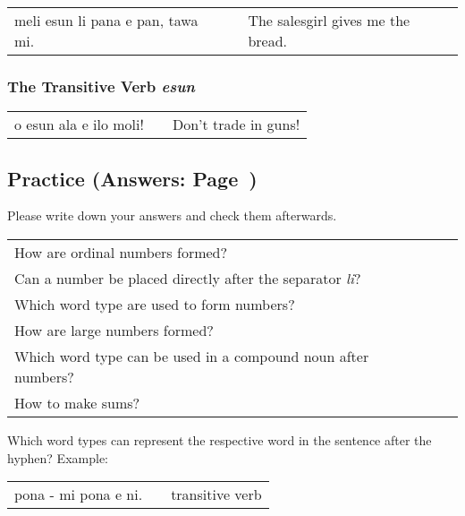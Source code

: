 \begin{supertabular}{p{5,5cm}|ll}
    meli esun li pana e pan, tawa mi. &  & The salesgirl gives me the bread. \\
\end{supertabular}

%
%
\subsubsection*{The Transitive Verb \textit{esun}}
%

\begin{supertabular}{p{5,5cm}|ll}
    o esun ala e ilo moli! &  & Don't trade in guns! \\
\end{supertabular}

%
%
%
\newpage
%
\subsection*{Practice (Answers: Page~\pageref{'numbers'})}
%
Please write down your answers and check them afterwards.

\begin{supertabular}{p{5,5cm}|ll}
    How are ordinal numbers formed?                                  &  & \\ %
    Can a number be placed directly after the separator \textit{li}? &  & \\ %
    Which word type are used to form numbers?                        &  & \\ %
    How are large numbers formed?                                    &  & \\ %
    Which word type can be used in a compound noun after numbers?    &  & \\ %
    How to make sums?                                                &  & \\ %
\end{supertabular}

Which word types can represent the respective word in the sentence after the hyphen?
Example:

\begin{supertabular}{p{5,5cm}|ll}
    pona - mi pona e ni. &  & transitive verb \\ %
\end{supertabular}

